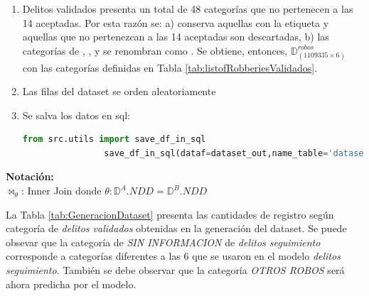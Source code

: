 \documentclass[onecolumn, journal, english, 12pt, a4paper]{IEEEtran} %
\theoremstyle{definition}
\begin{document}
\begin{enumerate}
        \item Delitos validados presenta un total de 48 categorías que
          no pertenecen a las 14 aceptadas. Por esta razón se: a)
          conserva aquellas con la etiqueta  y
          aquellas que no pertenezcan a las 14 aceptadas son
          descartadas, b) las categorías de , , y
           se renombran como
          . Se obtiene, entonces,
          $\mathbb{D}^{robos}_{(1109335 \times 6)}$ con las categorías
          definidas en Tabla \ref{tab:listofRobberiesValidados}.
        \item Las filas del dataset se orden aleatoriamente
        \item Se salva los datos en sql:
            \begin{lstlisting}[language=Python]
                from src.utils import save_df_in_sql
                save_df_in_sql(dataf=dataset_out,name_table='dataset_RobosDesagregation06122023')
            \end{lstlisting}
    \end{enumerate}

\textbf{Notación:}\\
$\bowtie_\theta$: Inner Join donde $\theta:\mathbb{D}^A.NDD=\mathbb{D}^B.NDD$ 


La Tabla \ref{tab:GeneracionDataset} presenta las cantidades de
registro según categoría de \emph{delitos validados} obtenidas en la
generación del dataset. Se puede obsevar que la categoría de \emph{SIN
  INFORMACION} de \emph{delitos seguimiento} corresponde a categorías
diferentes a las 6 que se usaron en el modelo \emph{delitos
  seguimiento}. También se debe observar que la categoría \emph{OTROS
  ROBOS} será ahora predicha por el modelo.
\end{document}

